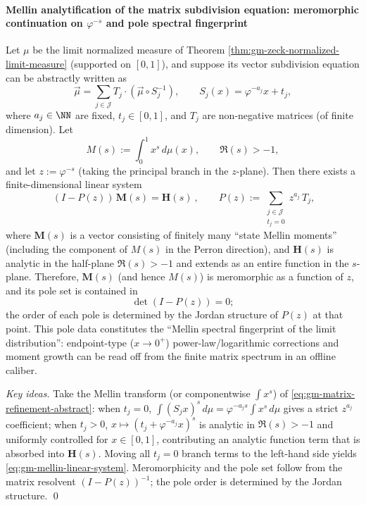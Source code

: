 \paragraph{Mellin analytification of the matrix subdivision equation: meromorphic continuation on \texorpdfstring{$\varphi^{-s}$}{phi^{-s}} and pole spectral fingerprint}
\begin{theorem}\label{thm:gm-mellin-meromorphic-fingerprint}
Let \(\mu\) be the limit normalized measure of Theorem \ref{thm:gm-zeck-normalized-limit-measure} (supported on \([0,1]\)), and suppose its vector subdivision equation can be abstractly written as
\begin{equation}\label{eq:gm-matrix-refinement-abstract}
\vec\mu=\sum_{j\in\mathcal{J}}T_j\cdot(\vec\mu\circ S_j^{-1}),
\qquad
S_j(x)=\varphi^{-a_j}x+t_j,
\end{equation}
where \(a_j\in\NN\) are fixed, \(t_j\in[0,1]\), and \(T_j\) are non-negative matrices (of finite dimension).
Let
\[
M(s):=\int_0^1 x^{s}\,d\mu(x),\qquad \Re(s)>-1,
\]
and let \(z:=\varphi^{-s}\) (taking the principal branch in the \(z\)-plane).
Then there exists a finite-dimensional linear system
\begin{equation}\label{eq:gm-mellin-linear-system}
\boxed{\ (I-P(z))\,\mathbf{M}(s)=\mathbf{H}(s)\ },
\qquad
P(z):=\sum_{\substack{j\in\mathcal{J}\\ t_j=0}} z^{a_j}\,T_j,
\end{equation}
where \(\mathbf{M}(s)\) is a vector consisting of finitely many ``state Mellin moments'' (including the component of \(M(s)\) in the Perron direction), and \(\mathbf{H}(s)\) is analytic in the half-plane \(\Re(s)>-1\) and extends as an entire function in the \(s\)-plane.
Therefore, \(\mathbf{M}(s)\) (and hence \(M(s)\)) is meromorphic as a function of \(z\), and its pole set is contained in
\[
\det(I-P(z))=0;
\]
the order of each pole is determined by the Jordan structure of \(P(z)\) at that point.
This pole data constitutes the ``Mellin spectral fingerprint of the limit distribution'': endpoint-type (\(x\to 0^+\)) power-law/logarithmic corrections and moment growth can be read off from the finite matrix spectrum in an offline caliber.
\end{theorem}

\begin{proof}[Key ideas]
Take the Mellin transform (or componentwise \(\int x^s\)) of \eqref{eq:gm-matrix-refinement-abstract}:
when \(t_j=0\), \(\int (S_j x)^s\,d\mu=\varphi^{-a_js}\int x^s\,d\mu\) gives a strict \(z^{a_j}\) coefficient;
when \(t_j>0\), \(x\mapsto (t_j+\varphi^{-a_j}x)^s\) is analytic in \(\Re(s)>-1\) and uniformly controlled for \(x\in[0,1]\), contributing an analytic function term that is absorbed into \(\mathbf{H}(s)\).
Moving all \(t_j=0\) branch terms to the left-hand side yields \eqref{eq:gm-mellin-linear-system}.
Meromorphicity and the pole set follow from the matrix resolvent \((I-P(z))^{-1}\); the pole order is determined by the Jordan structure. \qed
\end{proof}

